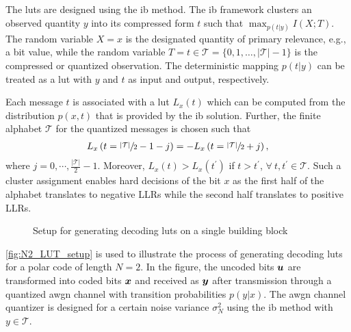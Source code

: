 The \glspl{lut} are designed using the \gls{ib} method\cite{tishby2000information}. The \gls{ib} framework clusters an observed quantity $y$ into its compressed form $t$ such that $\max_{p(t|y)}I(X;T)$. The random variable $X=x$ is the designated quantity of primary relevance, e.g., a bit value, while the random variable $T=t\in\mathcal{T}=\{ 0,1,\dots, |\mathcal{T}|-1\}$ is the compressed or quantized observation. The deterministic mapping $p(t|y)$ can be treated as a \gls{lut} with $y$ and $t$ as input and output, respectively. 

Each message $t$ is associated with a \gls{lut} $L_x(t)$ which can be computed from the distribution $p(x,t)$ that is provided by the \gls{ib} solution.
Further, the finite alphabet $\mathcal{T}$ for the quantized messages is chosen such that 
\begin{align*}
L_{x}\left(t = \sfrac{|\mathcal{T}|}{2} - 1 - j\right)= - L_{x}\left(t = \sfrac{|\mathcal{T}|}{2} + j\right),
\end{align*}
where $ j=0, \cdots , \frac{|\mathcal{T}|}{2} - 1$. 
Moreover, $L_x(t)>L_x(t^\prime)$ if $t>t^\prime$, $\forall \: t,t^\prime \in \mathcal{T}$. Such a cluster assignment enables hard decisions of the bit $x$ as the first half of the alphabet translates to negative LLRs while the second half translates to positive LLRs.

\begin{figure}
    \centering
    \resizebox{0.5\columnwidth}{!}{}
    \caption{Setup for generating decoding \glspl{lut} on a single building block}
    \label{fig:N2_LUT_setup}
\end{figure}

\autoref{fig:N2_LUT_setup} is used to illustrate the process of generating decoding \glspl{lut} for a polar code of length $N=2$.  In the figure, the uncoded bits $\bm{u}$ are transformed into coded bits $\bm{x}$ and received as $\bm{y}$ after transmission through a  quantized \gls{awgn} channel with transition probabilities $p(y|x)$.  The \gls{awgn} channel quantizer is designed for a certain noise variance $\sigma_N^2$ using the \gls{ib} method with $y \in \mathcal{T}$.

